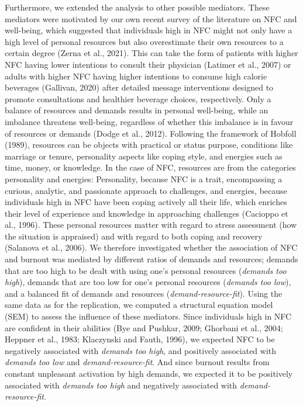 \documentclass[
  english,
  man,floatsintext]{apa6}
\begin{document}
Furthermore, we extended the analysis to other possible mediators.
These mediators were motivated by our own recent survey of the literature on NFC and well-being, which suggested that individuals high in NFC might not only have a high level of personal resources but also overestimate their own resources to a certain degree (Zerna et al., 2021).
This can take the form of patients with higher NFC having lower intentions to consult their physician (Latimer et al., 2007) or adults with higher NFC having higher intentions to consume high calorie beverages (Gallivan, 2020) after detailed message interventions designed to promote consultations and healthier beverage choices, respectively.
Only a balance of resources and demands results in personal well-being, while an imbalance threatens well-being, regardless of whether this imbalance is in favour of resources or demands (Dodge et al., 2012).
Following the framework of Hobfoll (1989), resources can be objects with practical or status purpose, conditions like marriage or tenure, personality aspects like coping style, and energies such as time, money, or knowledge.
In the case of NFC, resources are from the categories personality and energies: Personality, because NFC is a trait, encompassing a curious, analytic, and passionate approach to challenges, and energies, because individuals high in NFC have been coping actively all their life, which enriches their level of experience and knowledge in approaching challenges (Cacioppo et al., 1996).
These personal resources matter with regard to stress assessment (how the situation is appraised) and with regard to both coping and recovery (Salanova et al., 2006).
We therefore investigated whether the association of NFC and burnout was mediated by different ratios of demands and resources; demands that are too high to be dealt with using one's personal resources (\emph{demands too high}), demands that are too low for one's personal resources (\emph{demands too low}), and a balanced fit of demands and resources (\emph{demand-resource-fit}).
Using the same data as for the replication, we computed a structural equation model (SEM) to assess the influence of these mediators.
Since individuals high in NFC are confident in their abilities (Bye and Pushkar, 2009; Ghorbani et al., 2004; Heppner et al., 1983; Klaczynski and Fauth, 1996), we expected NFC to be negatively associated with \emph{demands too high}, and positively associated with \emph{demands too low} and \emph{demand-resource-fit}.
And since burnout results from constant unpleasant activation by high demands, we expected it to be positively associated with \emph{demands too high} and negatively associated with \emph{demand-resource-fit}.
\end{document}
